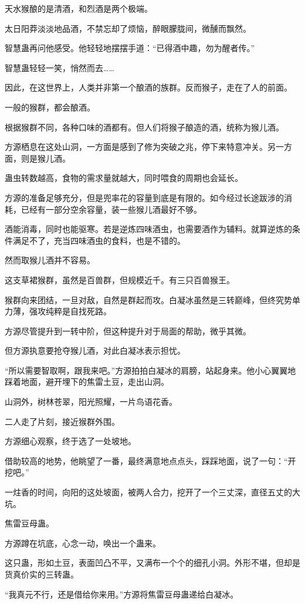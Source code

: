 \begin{this_body}
天水猴酿的是清酒，和烈酒是两个极端。

太日阳莽淡淡地品酒，不禁忘却了烦恼，醉眼朦胧间，微醺而飘然。

智慧蛊再问他感受。他轻轻地摆摆手道：“已得酒中趣，勿为醒者传。”

智慧蛊轻轻一笑，悄然而去……

因此，在这世界上，人类并非第一个酿酒的族群。反而猴子，走在了人的前面。

一般的猴群，都会酿酒。

根据猴群不同，各种口味的酒都有。但人们将猴子酿造的酒，统称为猴儿酒。

方源栖息在这处山洞，一方面是感到了修为突破之兆，停下来特意冲关。另一方面，则是猴儿酒。

蛊虫转数越高，食物的需求量就越大，同时喂食的周期也会延长。

方源的准备足够充分，但是兜率花的容量到底是有限的。如今经过长途跋涉的消耗，已经有一部分空余容量，装一些猴儿酒最好不够。

酒能消毒，同时也能驱寒。若是逆炼四味酒虫，也需要酒作为辅料。就算逆炼的条件满足不了，充当四味酒虫的食料，也是不错的。

然而取猴儿酒并不容易。

这支草裙猴群，虽然是百兽群，但规模近千。有三只百兽猴王。

猴群向来团结，一旦对敌，自然是群起而攻。白凝冰虽然是三转巅峰，但终究势单力薄，强攻纯粹是自找死路。

方源尽管提升到一转中阶，但这种提升对于局面的帮助，微乎其微。

但方源执意要抢夺猴儿酒，对此白凝冰表示担忧。

“所以需要智取啊，跟我来吧。”方源拍拍白凝冰的肩膀，站起身来。他小心翼翼地踩着地面，避开埋下的焦雷土豆，走出山洞。

山洞外，树林苍翠，阳光照耀，一片鸟语花香。

二人走了片刻，接近猴群外围。

方源细心观察，终于选了一处坡地。

借助较高的地势，他眺望了一番，最终满意地点点头，踩踩地面，说了一句：“开挖吧。”

一炷香的时间，向阳的这处坡面，被两人合力，挖开了一个三丈深，直径五丈的大坑。

焦雷豆母蛊。

方源蹲在坑底，心念一动，唤出一个蛊来。

这只蛊，形如土豆，表面凹凸不平，又满布一个个的细孔小洞。外形不堪，但却是货真价实的三转蛊。

“我真元不行，还是借给你来用。”方源将焦雷豆母蛊递给白凝冰。


\end{this_body}

